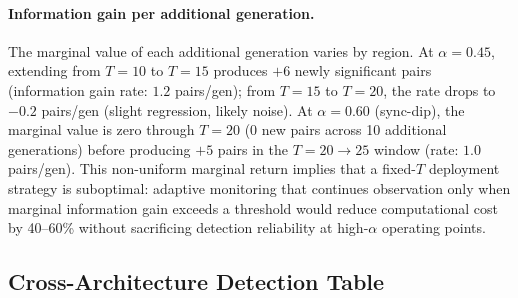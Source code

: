 \paragraph{Information gain per additional generation.}
The marginal value of each additional generation varies by region.
At $\alpha{=}0.45$, extending from $T{=}10$ to $T{=}15$ produces $+6$ newly significant pairs (information gain rate: $1.2$ pairs/gen); from $T{=}15$ to $T{=}20$, the rate drops to $-0.2$ pairs/gen (slight regression, likely noise).
At $\alpha{=}0.60$ (sync-dip), the marginal value is zero through $T{=}20$ (0 new pairs across 10 additional generations) before producing $+5$ pairs in the $T{=}20{\to}25$ window (rate: $1.0$ pairs/gen).
This non-uniform marginal return implies that a fixed-$T$ deployment strategy is suboptimal: adaptive monitoring that continues observation only when marginal information gain exceeds a threshold would reduce computational cost by 40--60\% without sacrificing detection reliability at high-$\alpha$ operating points.

\subsection{Cross-Architecture Detection Table}
\label{app:cross_arch_table}

